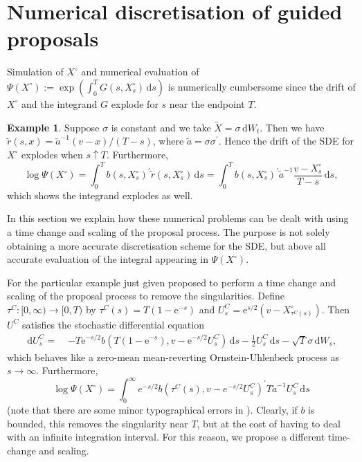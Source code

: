 \documentclass[preprint]{imsart}
\newcommand{\si}{\sigma}
\renewcommand{\tilde}{\widetilde}
\providecommand{\e}{\mathrm{e}}
\theoremstyle{definition}
\newtheorem{ex}[thm]{Example}
\newcommand{\dd}{{\,\mathrm d}}
\newcommand{\T}{{\prime}}
\begin{document}


\section{Numerical discretisation of guided proposals}\label{sec:tc}




Simulation of $X^\circ$ and numerical evaluation of $ \Psi(X^\circ) := \exp\left( \int_0^T G(s,X^\circ_s) \dd s\right)$  is numerically cumbersome since the drift of $X^\circ$ and the integrand  $G$ explode for $s$ near the endpoint $T$. 
\begin{ex}\label{ex:exploding}
Suppose $\si$ is constant and we take  $\tilde{X}= \si \dd W_t$. Then we have $\tilde{r}(s,x)= \tilde{a}^{-1} (v-x)/(T-s)$, where $\tilde{a}=\sigma \sigma^\T$. Hence the drift of the SDE for $X^\circ$ explodes when $s\uparrow T$.  Furthermore, 
\[	\log \Psi(X^\circ)=\int_0^T  b(s,X^\circ_s)^\T \tilde r(s,X^\circ_s) \dd s = \int_0^T  b(s,X^\circ_s)^\T  \tilde{a}^{-1} \frac{v-X^\circ_s}{T-s} \dd s, \]
which shows the integrand explodes as well. 
\end{ex}
In this section we explain how these numerical problems can be dealt with using a time change and scaling of the proposal process. The purpose is not solely obtaining a more accurate discretisation scheme for the SDE, but above all accurate  evaluation of the integral appearing in $\Psi(X^\circ)$. 

For the particular example just given \cite{Clark}   proposed to perform a time change and scaling of the proposal process to remove the singularities.  Define $\tau^C:[0,\infty) \to [0,T)$ by  $\tau^C(s) = T(1-\e^{-s})$ and  $U^C_s = \e^{s/2}(v -X^\circ_{\tau^C(s)})$. Then $U^C$ satisfies the stochastic differential equation
\begin{align*}
\dd U^C_s =  \;&   - T\e^{-s/2}b(T(1-\e^{-s}), v -\e^{-s/2} U^C_s  ) \dd s -\frac12  U^C_s \dd s -\sqrt{T} \sigma \dd W_s,  
\end{align*}
which behaves like a zero-mean  mean-reverting Ornstein-Uhlenbeck process as $s\to \infty$. Furthermore, 
\[  \log \Psi(X^\circ)= \int_0^\infty   e^{-s/2}b(\tau^C(s),v-e^{-s/2} U^C_s)^\T T \tilde{a}^{-1}   U_s^C  \dd s  
\]
(note that there are some minor typographical errors in \cite{Clark}). Clearly, if $b$ is bounded,  this removes the singularity near $T$, but at the cost of having to deal  with an infinite integration interval. For this reason, we propose a different time-change and scaling.
\end{document}
